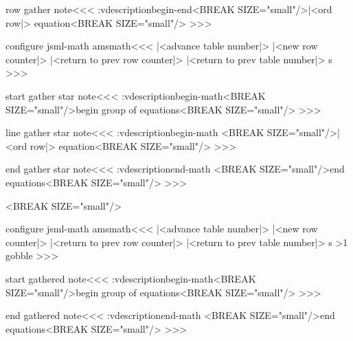 {\<row gather note\><<<
\add:vdescription{begin-end}{<BREAK SIZE="small"/>|<ord row|> equation<BREAK SIZE="small"/>}%
>>>


\<configure jsml-math amsmath\><<<
   {|<advance table number|>%
    |<new row counter|>%
    }
   {%
    |<return to prev row counter|>%
    |<return to prev table number|>}
   {}
   {\xdef\hrow:s{\HRow}} 
   {}
   {}
>>>

\<start gather star note\><<<
\add:vdescription{begin-math}{<BREAK SIZE="small"/>begin group of
  equations<BREAK SIZE="small"/>}%
>>>


\<line gather star note\><<<
\add:vdescription{begin-math}{%
   <BREAK SIZE="small"/>|<ord row|> equation<BREAK SIZE="small"/>}%
>>>





\<end gather star note\><<<
\add:vdescription{end-math}{%
   <BREAK SIZE="small"/>end equations<BREAK SIZE="small"/>}%
>>>

<BREAK SIZE="small"/>

\<configure jsml-math amsmath\><<<
   {|<advance table number|>%
    |<new row counter|>%
    }
   {%
    \Tag{gather-\TableNo}{\hrow:s}%
    |<return to prev row counter|>%
    |<return to prev table number|>}
   {}
   {\xdef\hrow:s{\HRow}} 
   {%
    \ifnum \HCol>1 \let\tagform@\:gobble \fi
   } 
   {}
>>>


\<start gathered note\><<<
\add:vdescription{begin-math}{<BREAK SIZE="small"/>begin group of
   equations<BREAK SIZE="small"/>}
>>>



\<end gathered note\><<<
\add:vdescription{end-math}{%
   <BREAK SIZE="small"/>end equations<BREAK SIZE="small"/>}%
>>>


}
